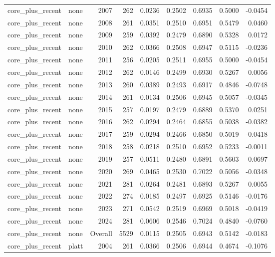 \begin{table}[t]
\begin{tabular}{@{} l l r r r r r r r @{} }
      core\_plus\_recent & none & 2007 & 262 & 0.0236 & 0.2502 & 0.6935 & 0.5000 & -0.0454 \\
      core\_plus\_recent & none & 2008 & 261 & 0.0351 & 0.2510 & 0.6951 & 0.5479 & 0.0460 \\
      core\_plus\_recent & none & 2009 & 259 & 0.0392 & 0.2479 & 0.6890 & 0.5328 & 0.0172 \\
      core\_plus\_recent & none & 2010 & 262 & 0.0366 & 0.2508 & 0.6947 & 0.5115 & -0.0236 \\
      core\_plus\_recent & none & 2011 & 256 & 0.0205 & 0.2511 & 0.6955 & 0.5000 & -0.0454 \\
      core\_plus\_recent & none & 2012 & 262 & 0.0146 & 0.2499 & 0.6930 & 0.5267 & 0.0056 \\
      core\_plus\_recent & none & 2013 & 260 & 0.0389 & 0.2493 & 0.6917 & 0.4846 & -0.0748 \\
      core\_plus\_recent & none & 2014 & 261 & 0.0134 & 0.2506 & 0.6945 & 0.5057 & -0.0345 \\
      core\_plus\_recent & none & 2015 & 257 & 0.0197 & 0.2479 & 0.6889 & 0.5370 & 0.0251 \\
      core\_plus\_recent & none & 2016 & 262 & 0.0294 & 0.2464 & 0.6855 & 0.5038 & -0.0382 \\
      core\_plus\_recent & none & 2017 & 259 & 0.0294 & 0.2466 & 0.6850 & 0.5019 & -0.0418 \\
      core\_plus\_recent & none & 2018 & 258 & 0.0218 & 0.2510 & 0.6952 & 0.5233 & -0.0011 \\
      core\_plus\_recent & none & 2019 & 257 & 0.0511 & 0.2480 & 0.6891 & 0.5603 & 0.0697 \\
      core\_plus\_recent & none & 2020 & 269 & 0.0465 & 0.2530 & 0.7022 & 0.5056 & -0.0348 \\
      core\_plus\_recent & none & 2021 & 281 & 0.0264 & 0.2481 & 0.6893 & 0.5267 & 0.0055 \\
      core\_plus\_recent & none & 2022 & 274 & 0.0185 & 0.2497 & 0.6925 & 0.5146 & -0.0176 \\
      core\_plus\_recent & none & 2023 & 271 & 0.0542 & 0.2519 & 0.6969 & 0.5018 & -0.0419 \\
      core\_plus\_recent & none & 2024 & 281 & 0.0606 & 0.2546 & 0.7024 & 0.4840 & -0.0760 \\
      core\_plus\_recent & none & Overall & 5529 & 0.0115 & 0.2505 & 0.6943 & 0.5142 & -0.0183 \\
      core\_plus\_recent & platt & 2004 & 261 & 0.0366 & 0.2506 & 0.6944 & 0.4674 & -0.1076 \\

\end{tabular}
\end{table}
